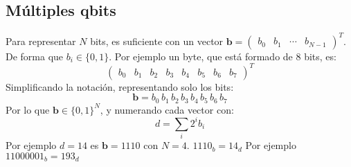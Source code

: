 \documentclass{article}
\newcommand*\mat[1]{ \begin{pmatrix} #1 \end{pmatrix}}
\theoremstyle{definition}
\newcommand\pgfmathsinandcos[3]{%
  \pgfmathsetmacro#1{sin(#3)}%
  \pgfmathsetmacro#2{cos(#3)}%
}
\newcommand\LongitudePlane[3][current plane]{%
  \pgfmathsinandcos\sinEl\cosEl{#2} %
  \pgfmathsinandcos\sint\cost{#3} %
  \tikzset{#1/.estyle={cm={\cost,\sint*\sinEl,0,\cosEl,(0,0)}}}
}
\newcommand\LatitudePlane[3][current plane]{%
  \pgfmathsinandcos\sinEl\cosEl{#2} %
  \pgfmathsinandcos\sint\cost{#3} %
  \pgfmathsetmacro\yshift{\cosEl*\sint}
  \tikzset{#1/.estyle={cm={\cost,0,0,\cost*\sinEl,(0,\yshift)}}} %
}
\newcommand\DrawLongitudeCircle[2][1]{
  \LongitudePlane{\angEl}{#2}
  \pgfmathsetmacro\angVis{atan(sin(#2)*cos(\angEl)/sin(\angEl))} %
  \draw[current plane] (\angVis:1) arc (\angVis:\angVis+180:1);
  \draw[current plane,dashed] (\angVis-180:1) arc (\angVis-180:\angVis:1);
}
\newcommand\DrawLatitudeCircle[2][1]{
  \LatitudePlane{\angEl}{#2}
  \pgfmathsetmacro\sinVis{sin(#2)/cos(#2)*sin(\angEl)/cos(\angEl)}
  \pgfmathsetmacro\angVis{asin(min(1,max(\sinVis,-1)))}
  \draw[current plane] (\angVis:1) arc (\angVis:-\angVis-180:1);
  \draw[current plane,dashed] (180-\angVis:1) arc (180-\angVis:\angVis:1);
}
\begin{document}
%
%
%
%
%
%
%
%

\subsection{Múltiples qbits}
Para representar $N$ bits, es suficiente con un vector $\boldsymbol{b} = 
\mat{b_0 & b_1 & \cdots & b_{N-1} }^T$. De forma que $b_i \in \{0,1\}$. Por 
ejemplo un byte, que está formado de 8 bits, es:
$$\mat{b_0 & b_1 & b_2 & b_3 & b_4 & b_5 & b_6 & b_7}^T$$
Simplificando la notación, representando solo los bits:
$$\boldsymbol{b} = b_0 \, b_1 \, b_2 \, b_3 \, b_4 \, b_5 \, b_6 \, b_7$$
Por lo que $\boldsymbol{b} \in \{0,1\}^N$, y numerando cada vector con:
$$d = \sum_i 2^i b_i$$
Por ejemplo $d=14$ es $\boldsymbol{b} = 1110$ con $N=4$. $1110_b = 14_d$
Por ejemplo $11000001_b = 193_d$
\end{document}

